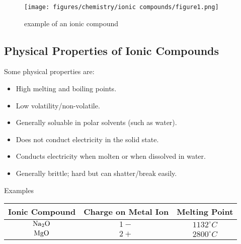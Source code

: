 \documentclass[12pt]{report}
\begin{document}
\begin{figure}[htb!]
\centering
    \texttt{[image: figures/chemistry/ionic compounds/figure1.png]}
    \caption{example of an ionic compound}
\end{figure}

\subsection{Physical Properties of Ionic Compounds}
Some physical properties are: 
\begin{itemize}
    \item{High melting and boiling points.}
    \item{Low volatility/non-volatile.}
    \item{Generally soluable in polar solvents (such as water).}
    \item{Does not conduct electricity in the solid state.}
    \item{Conducts electricity when molten or when dissolved in water.}
    \item{Generally brittle; hard but can shatter/break easily.}
\end{itemize}

\begin{table}[h!] %
    \begin{center}
        
        \renewcommand{\arraystretch}{1.5} %
        \setlength{\tabcolsep}{10pt} %
        \setlength{\arrayrulewidth}{0.25mm}

        Examples \\
        \vspace{0.5em}
        \begin{tabular}{|c|c|c|} %
        \hline
        \textbf{Ionic Compound} & \textbf{Charge on Metal Ion} & \textbf{Melting Point}\\ %
        \hline
        $ \ce{Na2O}$ & $1-$ & $1132 ^{\circ}C$ \\ %
        \hline
        $ \ce{MgO}$ & $2+$ & $2800 ^{\circ}C$\\
        \hline
        \end{tabular}
    \end{center}
\end{table}
\end{document}
